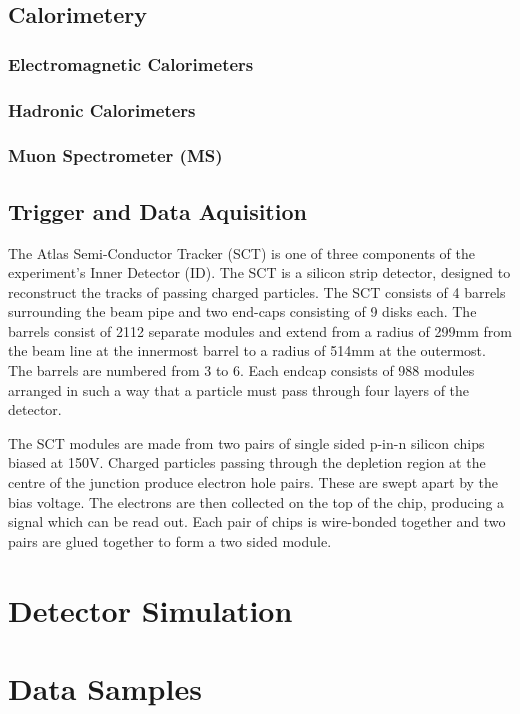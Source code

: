 \subsection{Calorimetery}
\subsubsection{Electromagnetic Calorimeters}
\subsubsection{Hadronic Calorimeters}
\subsubsection{Muon Spectrometer (MS)}
\subsection{Trigger and Data Aquisition}

\label{sec:Detector-SCT}

The Atlas Semi-Conductor Tracker (SCT) is one of three components of the experiment's Inner Detector (ID). The SCT is a silicon strip detector, designed to reconstruct the tracks of passing charged particles. The SCT consists of 4 barrels surrounding the beam pipe and two end-caps consisting of 9 disks each. The barrels consist of 2112 separate modules and extend from a radius of 299mm from the beam line at the innermost barrel to a radius of 514mm at the outermost. The barrels are numbered from 3 to 6. Each endcap consists of 988 modules arranged in such a way that a particle must pass through four layers of the detector.

The SCT modules are made from two pairs of single sided p-in-n silicon chips biased at 150V. Charged particles passing through the depletion region at the centre of the junction produce electron hole pairs. These are swept apart by the bias voltage. The electrons are then collected on the top of the chip, producing a signal which can be read out. Each pair of chips is wire-bonded together and two pairs are glued together to form a two sided module.

\section{Detector Simulation}
\section{Data Samples}

